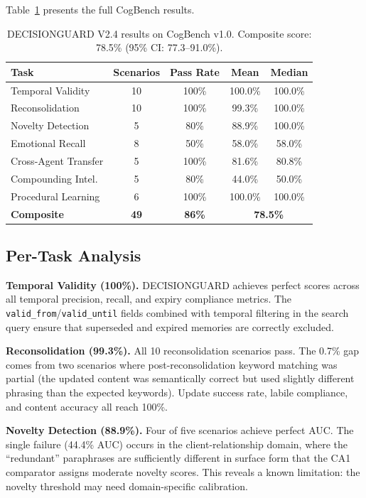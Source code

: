 \documentclass{article}
\begin{document}
Table~\ref{tab:results} presents the full CogBench results.

\begin{table}[t]
\centering
\caption{DECISIONGUARD V2.4 results on CogBench v1.0. Composite score: 78.5\% (95\% CI: 77.3--91.0\%).}
\label{tab:results}
\small
\begin{tabular}{lcccc}
\toprule
\textbf{Task} & \textbf{Scenarios} & \textbf{Pass Rate} & \textbf{Mean} & \textbf{Median} \\
\midrule
Temporal Validity & 10 & 100\% & 100.0\% & 100.0\% \\
Reconsolidation & 10 & 100\% & 99.3\% & 100.0\% \\
Novelty Detection & 5 & 80\% & 88.9\% & 100.0\% \\
Emotional Recall & 8 & 50\% & 58.0\% & 58.0\% \\
Cross-Agent Transfer & 5 & 100\% & 81.6\% & 80.8\% \\
Compounding Intel. & 5 & 80\% & 44.0\% & 50.0\% \\
Procedural Learning & 6 & 100\% & 100.0\% & 100.0\% \\
\midrule
\textbf{Composite} & \textbf{49} & \textbf{86\%} & \multicolumn{2}{c}{\textbf{78.5\%}} \\
\bottomrule
\end{tabular}
\end{table}

\subsection{Per-Task Analysis}

\textbf{Temporal Validity (100\%).} DECISIONGUARD achieves perfect scores across all temporal precision, recall, and expiry compliance metrics. The \texttt{valid\_from}/\texttt{valid\_until} fields combined with temporal filtering in the search query ensure that superseded and expired memories are correctly excluded.

\textbf{Reconsolidation (99.3\%).} All 10 reconsolidation scenarios pass. The 0.7\% gap comes from two scenarios where post-reconsolidation keyword matching was partial (the updated content was semantically correct but used slightly different phrasing than the expected keywords). Update success rate, labile compliance, and content accuracy all reach 100\%.

\textbf{Novelty Detection (88.9\%).} Four of five scenarios achieve perfect AUC. The single failure (44.4\% AUC) occurs in the client-relationship domain, where the ``redundant'' paraphrases are sufficiently different in surface form that the CA1 comparator assigns moderate novelty scores. This reveals a known limitation: the novelty threshold may need domain-specific calibration.
\end{document}
